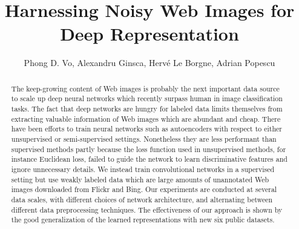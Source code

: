\documentclass[preprint,12pt]{elsarticle}
\begin{document}
\begin{frontmatter}



\title{Harnessing Noisy Web Images for Deep Representation}

\author{Phong D. Vo, Alexandru Ginsca, Herv\'e Le Borgne, Adrian Popescu}
\address{Vision \& Content Engineering Laboratory \\CEA LIST, France}

\author{}

\address{}

\begin{abstract}
The keep-growing content of Web images is probably the next important data source to scale up deep neural networks which recently surpass human in image classification tasks. The fact that deep networks are hungry for labeled data limits themselves from extracting valuable information of Web images which are abundant and cheap. There have been efforts to train neural networks such as autoencoders with respect to either unsupervised or semi-supervised settings. Nonetheless they are less performant than supervised methods partly because the loss function used in unsupervised methods, for instance Euclidean loss, failed to guide the network to learn discriminative features and ignore unnecessary details. We instead train convolutional networks in a supervised setting but use weakly labeled data which are large amounts of unannotated Web images downloaded from Flickr and Bing. Our experiments are conducted at several data scales, with different choices of network architecture, and alternating between different data preprocessing techniques. The effectiveness of our approach is shown by the good generalization of the learned representations with new six public datasets. 
\end{abstract}


\end{frontmatter}
\end{document}
